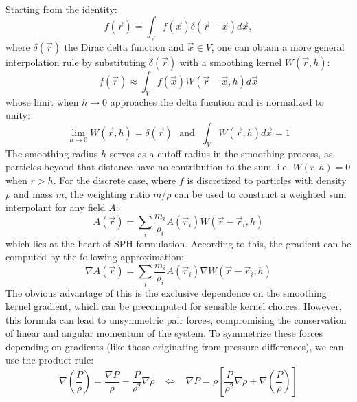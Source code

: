\documentclass{llncs}
\begin{document}
\paragraph{} Starting from the identity:
\begin{equation*}
  f(\vec{r}) = \int_Vf(\vec{x}) \delta(\vec{r} - \vec{x}) d\vec{x},
\end{equation*}
where $\delta(\vec{r})$ the Dirac delta function and $\vec{x} \in V$, one can obtain a
more general interpolation rule by substituting $\delta(\vec{r})$ with a smoothing kernel
$W(\vec{r}, h)$:
\begin{equation*}
  \label{eq:c-approx}
  f(\vec{r}) \approx \int_V f(\vec{x}) W(\vec{r}-\vec{x}, h) d\vec{x}
\end{equation*}
whose limit when $h\to0$ approaches the delta fucntion and is normalized to unity:
\begin{equation*}
  \label{eq:kernel-properties}
  \lim_{h\to0}W(\vec{r}, h) = \delta(\vec{r})\ \ \
  \text{and}\ \ \
  \int_VW(\vec{r}, h) d\vec{x} = 1
\end{equation*}
The smoothing radius $h$ serves as a cutoff radius in the smoothing process, as particles
beyond that distance have no contribution to the sum, i.e. $W(r,h) = 0$ when $r>h$. For
the discrete case, where $f$ is discretized to particles with density $\rho$ and mass $m$,
the weighting ratio $m/\rho$ can be used to construct a weighted sum interpolant for any
field $A$:
\begin{equation}
  \label{eq:d-approx}
  A(\vec{r}) = \sum_i \frac{m_i}{\rho_i} A(\vec{r}_i) W(\vec{r}-\vec{r}_i, h)
\end{equation}
which lies at the heart of SPH formulation. According to this, the gradient can be
computed by the following approximation:
\begin{equation}
  \label{eq:d-grad}
  \nabla A(\vec{r}) = \sum_i \frac{m_i}{\rho_i} A(\vec{r}_i) \nabla W(\vec{r} - \vec{r}_i, h)
\end{equation}
The obvious advantage of this is the exclusive dependence on the smoothing kernel
gradient, which can be precomputed for sensible kernel choices. However, this formula can
lead to unsymmetric pair forces, compromising the conservation of linear and angular
momentum of the system. To symmetrize these forces depending on gradients (like those
originating from pressure differences), we can use the product rule:
\begin{equation*}
  \label{eq:grad-identity}
  \nabla \left( \frac{P}{\rho} \right) =
  \frac{\nabla P}{\rho}-
  \frac{P}{\rho^2} \nabla \rho
  \hspace{10pt} \Leftrightarrow \hspace{10pt}
  \nabla P = \rho \left[ \frac{P}{\rho^2} \nabla \rho + \nabla \left( \frac{P}{\rho}
    \right) \right]
\end{equation*}
\end{document}

